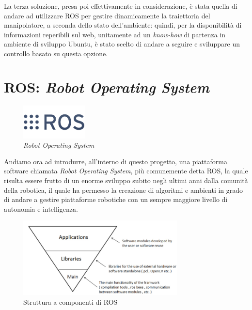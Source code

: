 La terza soluzione, presa poi effettivamente in considerazione, è stata quella di andare ad utilizzare ROS per gestire dinamicamente la traiettoria del manipolatore, a seconda dello stato dell'ambiente: quindi, per la disponibilità di informazioni reperibili sul web, unitamente ad un \emph{know-how} di partenza in ambiente di sviluppo Ubuntu, è stato scelto di andare a seguire e sviluppare un controllo basato su questa opzione.

\chapter{ROS: \emph{Robot Operating System}}
\begin{figure}[h]
	\centering
	\includegraphics[width=0.3\textwidth]{Immagini/Logo_ROS}
	\caption{\emph{Robot Operating System}}
	\label{fig:LogoROS}
\end{figure}
Andiamo ora ad introdurre, all'interno di questo progetto, una piattaforma software chiamata \emph{Robot Operating System}, più comunemente detta ROS, la quale risulta essere frutto di un enorme sviluppo subito negli ultimi anni dalla comunità della robotica, il quale ha permesso la creazione di algoritmi e ambienti in grado di andare a gestire piattaforme robotiche con un sempre maggiore livello di autonomia e intelligenza.
\begin{figure}[h]
	\centering
	\includegraphics[width=0.75\textwidth]{Immagini/ROS_ComponentBased}
	\caption{Struttura a componenti di ROS}
	\label{fig:ROS-ComponentBased}
\end{figure}

